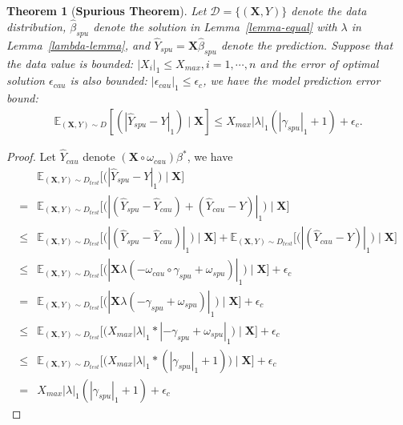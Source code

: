 \documentclass{article}
\theoremstyle{plain}
\newtheorem{theorem}{Theorem}[section]
\theoremstyle{definition}
\theoremstyle{remark}
\begin{document}
\begin{theorem}[\textbf{Spurious Theorem}]
Let $\mathcal{D}=\{(\textbf{X},Y)\}$ denote the data distribution, $\hat{\beta}_{spu}$ denote the solution in Lemma~\ref{lemma-equal} with $\lambda$ in Lemma~\ref{lambda-lemma},
and $\hat{Y}_{spu}=\textbf{X}\hat{\beta}_{spu}$ denote the prediction.
Suppose that the data value is bounded: $|X_i|_1 \leq X_{max}, i=1,\cdots,n$ and the error of optimal solution $\epsilon_{cau}$ is also bounded: $|\epsilon_{cau}|_1\leq\epsilon_c$, we have the model prediction error bound:
\begin{align}
\mathbb{E}_{(\textbf{X},Y)\sim D}[(|\hat{Y}_{spu}-Y|_1)\mid \textbf{X}]\leq X_{max}|\lambda|_1(|\gamma_{spu}|_1+1)+\epsilon_{c}.
\end{align}
\end{theorem}


\begin{proof}

Let $\hat{Y}_{cau}$ denote $(\textbf{X}\circ\omega_{cau})\beta^*$, we have
\begin{align*}
&\mathbb{E}_{(\textbf{X},Y)\sim D_{test}}\Big[\Big(|\hat{Y}_{spu}-Y|_1\Big)\mid \textbf{X}\Big]\\
=&\mathbb{E}_{(\textbf{X},Y)\sim D_{test}}\Big[\Big(|(\hat{Y}_{spu}-\hat{Y}_{cau})+(\hat{Y}_{cau}-Y)|_1\Big)\mid \textbf{X}\Big]\\
\leq&\mathbb{E}_{(\textbf{X},Y)\sim D_{test}}\Big[\Big(|(\hat{Y}_{spu}-\hat{Y}_{cau})|_1\Big)\mid \textbf{X}\Big] 
+\mathbb{E}_{(\textbf{X},Y)\sim D_{test}}\Big[\Big(|(\hat{Y}_{cau}-Y)|_1\Big)\mid \textbf{X}\Big]\\
\leq&\mathbb{E}_{(\textbf{X},Y)\sim D_{test}}\Big[\Big(|\textbf{X}\lambda(-\omega_{cau}\circ\gamma_{spu}+\omega_{spu})|_1\Big)\mid \textbf{X}\Big]+\epsilon_{c}\\
=&\mathbb{E}_{(\textbf{X},Y)\sim D_{test}}\Big[\Big(|\textbf{X}\lambda (-\gamma_{spu}+\omega_{spu})|_1\Big)\mid \textbf{X}\Big]+\epsilon_{c}\\
\leq&\mathbb{E}_{(\textbf{X},Y)\sim D_{test}}\Big[\Big(X_{max}|\lambda|_1 *|-\gamma_{spu}+\omega_{spu}|_1\Big)\mid \textbf{X}\Big]+\epsilon_{c}\\
\leq&\mathbb{E}_{(\textbf{X},Y)\sim D_{test}}\Big[\Big(X_{max}|\lambda|_1*(|\gamma_{spu}|_1+1)\Big)\mid \textbf{X}\Big]+\epsilon_{c}\\
=&X_{max}|\lambda|_1(|\gamma_{spu}|_1+1)+\epsilon_{c}
\end{align*}
\end{proof}
\end{document}

